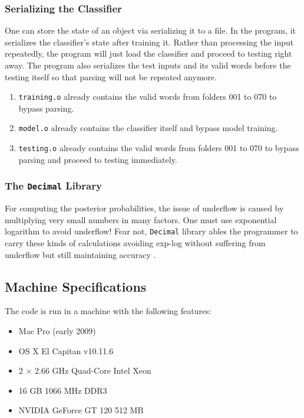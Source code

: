 \documentclass{article}
\begin{document}
\subsubsection*{Serializing the Classifier}
One can store the state of an object via serializing it to a file. In the program, it serializes the classifier's state after training it. Rather than processing the input repeatedly, the program will just load the classifier and proceed to testing right away. The program also serializes the test inputs and its valid words before the testing itself so that parsing will not be repeated anymore.

\begin{enumerate}
	\item \texttt{training.o} already contains the valid words from folders 001 to 070 to bypass parsing.
	\item \texttt{model.o} already contains the classifier itself and bypass model training.
	\item \texttt{testing.o} already contains the valid words from folders 001 to 070 to bypass parsing and proceed to testing immediately.
\end{enumerate}

\subsubsection*{The \texttt{Decimal} Library}
For computing the posterior probabilities, the issue of underflow is caused by multiplying very small numbers in many factors. One must use exponential logarithm to avoid underflow! Fear not, \texttt{Decimal} library ables the programmer to carry these kinds of calculations avoiding exp-log without suffering from underflow but still maintaining accuracy \cite{bib:dec}.

\subsection{Machine Specifications}
The code is run in a machine with the following features:
\begin{itemize}
	\item Mac Pro (early 2009)
	\item OS X El Capitan v10.11.6
	\item 2 $\times$ 2.66 GHz Quad-Core Intel Xeon
	\item 16 GB 1066 MHz DDR3
	\item NVIDIA GeForce GT 120 512 MB
\end{itemize}
\end{document}
